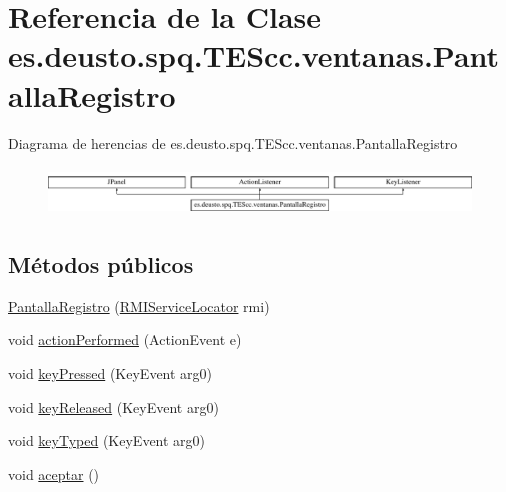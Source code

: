 \hypertarget{classes_1_1deusto_1_1spq_1_1_t_e_scc_1_1ventanas_1_1_pantalla_registro}{\section{Referencia de la Clase es.\+deusto.\+spq.\+T\+E\+Scc.\+ventanas.\+Pantalla\+Registro}
\label{classes_1_1deusto_1_1spq_1_1_t_e_scc_1_1ventanas_1_1_pantalla_registro}
}
Diagrama de herencias de es.\+deusto.\+spq.\+T\+E\+Scc.\+ventanas.\+Pantalla\+Registro\begin{figure}[H]
\begin{center}
\leavevmode
\includegraphics[height=1.296296cm]{classes_1_1deusto_1_1spq_1_1_t_e_scc_1_1ventanas_1_1_pantalla_registro}
\end{center}
\end{figure}
\subsection*{Métodos públicos}
\begin{DoxyCompactItemize}
\item 
\hyperlink{classes_1_1deusto_1_1spq_1_1_t_e_scc_1_1ventanas_1_1_pantalla_registro_a2f7a778c9450ae6376a44a3978c01656}{Pantalla\+Registro} (\hyperlink{classes_1_1deusto_1_1spq_1_1_t_e_scc_1_1cliente_1_1_r_m_i_service_locator}{R\+M\+I\+Service\+Locator} rmi)
\item 
void \hyperlink{classes_1_1deusto_1_1spq_1_1_t_e_scc_1_1ventanas_1_1_pantalla_registro_a0ccb30246a2ea517d1eef971f8658915}{action\+Performed} (Action\+Event e)
\item 
void \hyperlink{classes_1_1deusto_1_1spq_1_1_t_e_scc_1_1ventanas_1_1_pantalla_registro_af5a7b5c5d1a63048b613ebadcf50ca93}{key\+Pressed} (Key\+Event arg0)
\item 
void \hyperlink{classes_1_1deusto_1_1spq_1_1_t_e_scc_1_1ventanas_1_1_pantalla_registro_abf43377e61cdac8edc68048b722d9d8d}{key\+Released} (Key\+Event arg0)
\item 
void \hyperlink{classes_1_1deusto_1_1spq_1_1_t_e_scc_1_1ventanas_1_1_pantalla_registro_aec21ca5fdb3ab6c6bcd4e2455145a80b}{key\+Typed} (Key\+Event arg0)
\item 
void \hyperlink{classes_1_1deusto_1_1spq_1_1_t_e_scc_1_1ventanas_1_1_pantalla_registro_a2b3ed979f9ab73d7e4d50a7b707775d9}{aceptar} ()
\end{DoxyCompactItemize}


